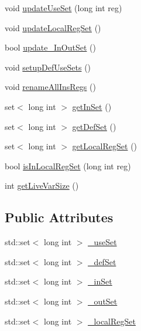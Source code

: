 \begin{DoxyCompactItemize}
\item 
void \hyperlink{classbasicblock_a13aad72bd6dce3b9d6fd47dd324504d3}{updateUseSet} (long int reg)
\item 
void \hyperlink{classbasicblock_abae11bf0376749457259a6d2a2ef8fe7}{updateLocalRegSet} ()
\item 
bool \hyperlink{classbasicblock_af543b2aba60aec6408825fe513736a8d}{update\_\-InOutSet} ()
\item 
void \hyperlink{classbasicblock_a828499c93c05d54ff789feed38051428}{setupDefUseSets} ()
\item 
void \hyperlink{classbasicblock_a8493801bbd0b56aac41aa8cd2aedcea4}{renameAllInsRegs} ()
\item 
set$<$ long int $>$ \hyperlink{classbasicblock_a449cfdd7832d738451da0d773f45a120}{getInSet} ()
\item 
set$<$ long int $>$ \hyperlink{classbasicblock_a208aa13365196998e48936c287242a77}{getDefSet} ()
\item 
set$<$ long int $>$ \hyperlink{classbasicblock_ab2b0c4f29f9d14e0073ca924f4beefab}{getLocalRegSet} ()
\item 
bool \hyperlink{classbasicblock_afe08d56238e85bb143c4a0bb79c585b1}{isInLocalRegSet} (long int reg)
\item 
int \hyperlink{classbasicblock_a656948a155ce6ed622a31581c4d3c2f0}{getLiveVarSize} ()
\end{DoxyCompactItemize}
\subsection*{Public Attributes}
\begin{DoxyCompactItemize}
\item 
std::set$<$ long int $>$ \hyperlink{classbasicblock_aaff8e15dfe5fa007a97965f5d5c6e8da}{\_\-useSet}
\item 
std::set$<$ long int $>$ \hyperlink{classbasicblock_a10324f2866495c2fbd24b7c8e05af7be}{\_\-defSet}
\item 
std::set$<$ long int $>$ \hyperlink{classbasicblock_ac93c3bff2754390b7d24d44a652f1dfa}{\_\-inSet}
\item 
std::set$<$ long int $>$ \hyperlink{classbasicblock_ac9145f343d3538730f25fe0469420ba8}{\_\-outSet}
\item 
std::set$<$ long int $>$ \hyperlink{classbasicblock_aad1405bed7911414e0ed1332419e48b8}{\_\-localRegSet}
\end{DoxyCompactItemize}


